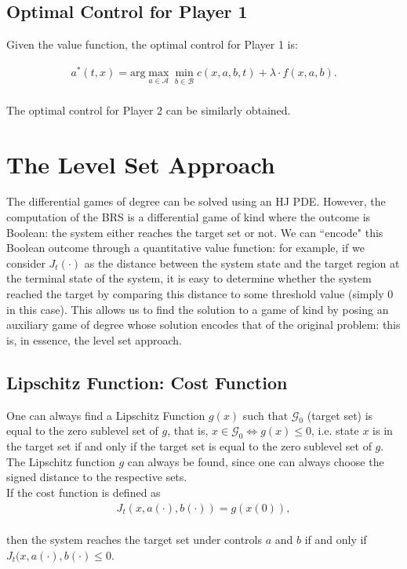 \documentclass{article}
\begin{document}
\subsection{Optimal Control for Player 1}
Given the value function, the optimal control for Player 1 is:

\begin{align}
    a^{*}(t,x) = \text{arg}\max_{a \in \mathcal{A}} \min_{b \in \mathcal{B}} c(x,a,b,t) + \lambda \cdot f(x,a,b).
\end{align}
\\
The optimal control for Player 2 can be similarly obtained.

\newpage

\section{The Level Set Approach}
\quad The differential games of degree can be solved using an HJ PDE. However, the computation of the BRS is a differential game of kind where the outcome is Boolean: the system either reaches the target set or not. We can ``encode" this Boolean outcome through a quantitative value function:
for example, if we consider $J_t(\cdot)$ as the distance between the system state and the target region at the terminal state of the system, it is easy to determine whether the system reached the target by comparing this distance to some threshold value (simply 0 in this case). This allows us to find the solution to a game of kind by posing an auxiliary game of degree whose solution encodes that of the original problem: this is, in essence, the level set approach.

\subsection{Lipschitz Function: Cost Function}
\quad One can always find a Lipschitz Function $g(x)$ such that $\mathcal{G}_0$ (target set) is equal to the zero sublevel set of $g$, that is, $x \in \mathcal{G}_0 \iff g(x) \leq 0$, i.e. state $x$ is in the target set if and only if the target set is equal to the zero sublevel set of $g$.\\
\quad The Lipschitz function $g$ can always be found, since one can always choose the signed distance to the respective sets.\\
\quad If the cost function is defined as
\begin{align}
    J_t(x,a(\cdot), b(\cdot)) = g(x(0)),
\end{align}
\\
then the system reaches the target set under controls $a$ and $b$ if and only if $J_t(x,a(\cdot),b(\cdot) \leq 0$. 
\end{document}
